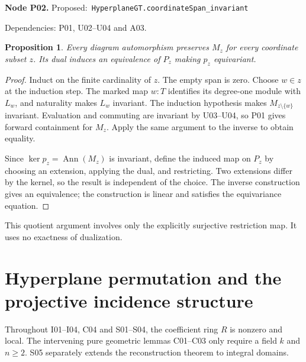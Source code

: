 \documentclass[11pt]{article}
\newtheorem{proposition}[theorem]{Proposition}
\theoremstyle{remark}\newtheorem{remark}[theorem]{Remark}
\newcommand{\Ann}{\operatorname{Ann}}
\newcommand{\code}[1]{\nolinkurl{#1}}
\newcommand{\node}[3]{\par\Needspace{8\baselineskip}\smallskip\noindent\textbf{Node #1.}\quad
 \textsf{Proposed:}\ \code{#2}\par\noindent
 \textsf{Dependencies:} #3.\par\smallskip}
\begin{document}
\node{P02}{HyperplaneGT.coordinateSpan_invariant}{P01, U02--U04 and A03}
\begin{proposition}\label{prop:p02}
Every diagram automorphism preserves $M_z$ for every coordinate
subset $z$. Its dual induces an equivalence of $P_z$ making $p_z$
equivariant.
\end{proposition}
\begin{proof}
Induct on the finite cardinality of $z$. The empty span is zero.
Choose $w\in z$ at the induction step. The marked map $w:T$
identifies its degree-one module with $L_w$, and naturality makes
$L_w$ invariant. The induction hypothesis makes $M_{z\setminus\{w\}}$
invariant. Evaluation and commuting are invariant by U03--U04,
so P01 gives forward containment for $M_z$. Apply the same
argument to the inverse to obtain equality.

Since $\ker p_z=\Ann(M_z)$ is invariant, define the induced map on
$P_z$ by choosing an extension, applying the dual, and restricting.
Two extensions differ by the kernel, so the result is independent
of the choice. The inverse construction gives an equivalence;
the construction is linear and satisfies the equivariance equation.
\end{proof}
This quotient argument involves only the explicitly surjective
restriction map. It uses no exactness of dualization.

\section{Hyperplane permutation and the projective incidence structure}

Throughout I01--I04, C04 and S01--S04, the coefficient ring $R$
is nonzero and local. The intervening pure geometric lemmas
C01--C03 only require a field $k$ and $n\ge2$. S05 separately
extends the reconstruction theorem to integral domains.
\end{document}
